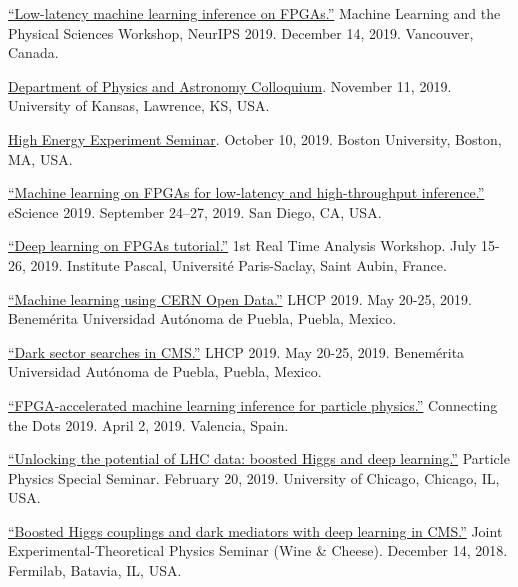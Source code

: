 \documentclass[11pt]{res}
\begin{document}
\begin{resume}

\href{https://ml4physicalsciences.github.io/files/NeurIPS_ML4PS_2019_74.pdf}{``Low-latency machine learning inference on FPGAs.''} Machine Learning and the Physical Sciences Workshop, NeurIPS 2019.  December 14, 2019. Vancouver, Canada.

\href{https://physics.drupal.ku.edu/calendar/colloquia#/?i=2}{Department of Physics and Astronomy Colloquium}. November 11, 2019. University of Kansas, Lawrence, KS, USA.

\href{http://physics.bu.edu/events/show/2204}{High Energy Experiment Seminar}. October 10, 2019. Boston University, Boston, MA, USA.

\href{https://escience2019.sdsc.edu/program}{``Machine
  learning on FPGAs for low-latency and high-throughput inference.''}
eScience 2019. September 24–27, 2019. San Diego, CA, USA.

\href{https://indico.cern.ch/event/793125/contributions/3495251/}{``Deep learning on FPGAs tutorial.''} 1st Real Time Analysis Workshop. July 15-26, 2019. Institute Pascal, Universit\'{e} Paris-Saclay, Saint Aubin, France.

\href{https://indico.cern.ch/event/687651/contributions/3428206/}{``Machine
  learning using CERN Open Data.''} LHCP 2019. May
  20-25, 2019. Benem\'{e}rita Universidad Aut\'{o}noma de Puebla, Puebla, Mexico.

\href{https://indico.cern.ch/event/687651/contributions/3426898/}{``Dark
  sector searches in CMS.''} LHCP 2019. May
  20-25, 2019. Benem\'{e}rita Universidad Aut\'{o}noma de Puebla, Puebla, Mexico.

\href{https://indico.cern.ch/event/742793/contributions/3274392/}{``FPGA-accelerated
  machine learning inference for particle physics.''} Connecting the
Dots 2019. April 2, 2019. Valencia, Spain.

\href{https://universityofchicago.hosted.panopto.com/Panopto/Pages/Viewer.aspx?id=66ca09d7-74c1-4b12-bb57-a9fa01046cdf}{``Unlocking
  the potential of LHC data: boosted Higgs and deep learning.''}
Particle Physics Special Seminar. February 20, 2019. University of Chicago, Chicago, IL, USA.

\href{http://theory.fnal.gov/events/event/results-from-cms-18/}{``Boosted
  Higgs couplings and dark mediators with deep learning in CMS.''}
Joint Experimental-Theoretical Physics Seminar (Wine \& Cheese). December 14, 2018. Fermilab, Batavia, IL, USA.


\end{resume}
\end{document}
